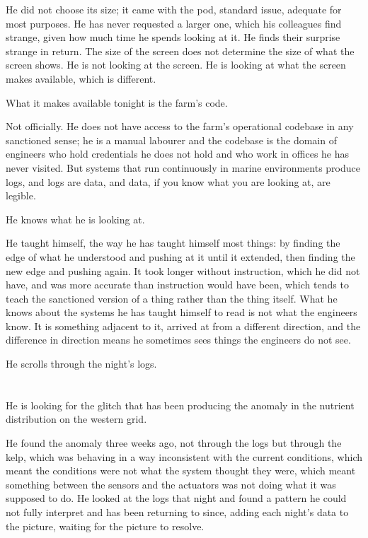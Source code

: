 He did not choose its size; it came with the pod,
standard issue, adequate for most purposes. He has
never requested a larger one, which his colleagues
find strange, given how much time he spends looking
at it. He finds their surprise strange in return.
The size of the screen does not determine the size
of what the screen shows. He is not looking at the
screen. He is looking at what the screen makes
available, which is different.

What it makes available tonight is the farm's
code.

Not officially. He does not have access to the
farm's operational codebase in any sanctioned sense;
he is a manual labourer and the codebase is the
domain of engineers who hold credentials he does
not hold and who work in offices he has never
visited. But systems that run continuously in
marine environments produce logs, and logs are
data, and data, if you know what you are looking
at, are legible.

He knows what he is looking at.

He taught himself, the way he has taught himself
most things: by finding the edge of what he
understood and pushing at it until it extended,
then finding the new edge and pushing again. It
took longer without instruction, which he did not
have, and was more accurate than instruction would
have been, which tends to teach the sanctioned
version of a thing rather than the thing itself.
What he knows about the systems he has taught
himself to read is not what the engineers know.
It is something adjacent to it, arrived at from
a different direction, and the difference in
direction means he sometimes sees things the
engineers do not see.

He scrolls through the night's logs.

\section{}

He is looking for the glitch that has been
producing the anomaly in the nutrient distribution
on the western grid.

He found the anomaly three weeks ago, not through
the logs but through the kelp, which was behaving
in a way inconsistent with the current conditions,
which meant the conditions were not what the system
thought they were, which meant something between
the sensors and the actuators was not doing what
it was supposed to do. He looked at the logs that
night and found a pattern he could not fully
interpret and has been returning to since, adding
each night's data to the picture, waiting for the
picture to resolve.

